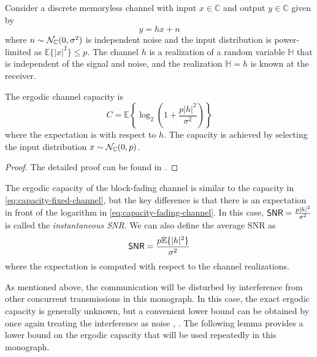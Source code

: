\begin{lemma} \label{lemma:capacity-memoryless-random} 
Consider a discrete memoryless channel with input $x \in \mathbb{C}$ and output $y \in \mathbb{C}$ given by
\begin{equation}
y = h x + n
\end{equation}
where $n \sim \mathcal{N}_{\mathbb{C}}(0,\sigma^2)$ is independent noise and the input distribution is power-limited as $\mathbb{E}\{ |x|^2 \} \leq p$.
The channel $h$ is a realization of a random variable $\mathbb{H}$ that is independent of the signal and noise, and the realization $\mathbb{H}=h$ is known at the receiver.

The ergodic channel capacity is
\begin{equation} \label{eq:capacity-fading-channel}
C = \mathbb{E} \left\{ \log_2 \left(1+\frac{p |h|^2}{\sigma^2} \right) \right\}
\end{equation}
where the expectation is with respect to $h$. The capacity is  achieved by selecting the input distribution $x \sim \mathcal{N}_{\mathbb{C}}(0,p)$.
\end{lemma}
\begin{proof}
The detailed proof can be found in \cite[App.~C.1.1]{massivemimobook}.
\end{proof}

The ergodic capacity of the block-fading channel is similar to the capacity in \eqref{eq:capacity-fixed-channel}, but the key difference is that there is an expectation in front of the logarithm in \eqref{eq:capacity-fading-channel}. In this case, $\mathsf{SNR} = \frac{p |h|^2}{\sigma^2}$ is called the \emph{instantaneous \gls{SNR}}.
We can also define the average \gls{SNR} as
\begin{equation} \label{eq:average-SNR-basic-def}
 \mathsf{SNR} = \frac{p \mathbb{E} \{ |h|^2 \}  }{ \sigma^2}
\end{equation}
where the expectation is computed with respect to the channel realizations. 

As mentioned above, the communication will be disturbed by interference from other concurrent transmissions in this monograph.
 In this case, the exact ergodic capacity is generally unknown, but a convenient lower bound can be obtained by once again treating the interference as noise \cite{Biglieri1998a}, \cite{Medard2000a}. The following lemma provides a lower bound on the ergodic capacity that will be used repeatedly in this monograph.


